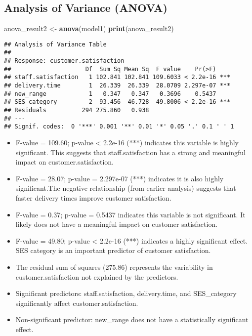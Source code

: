 \documentclass[
]{article}
\newenvironment{Shaded}{\begin{snugshade}}{\end{snugshade}}
\newcommand{\FunctionTok}[1]{\textcolor[rgb]{0.13,0.29,0.53}{\textbf{#1}}}
\newcommand{\NormalTok}[1]{#1}
\newcommand{\OtherTok}[1]{\textcolor[rgb]{0.56,0.35,0.01}{#1}}
\providecommand{\tightlist}{%
  \setlength{\itemsep}{0pt}\setlength{\parskip}{0pt}}
\begin{document}
\subsection{Analysis of Variance
(ANOVA)}\label{analysis-of-variance-anova-1}

\begin{Shaded}
\begin{Highlighting}[]
\NormalTok{anova\_result2 }\OtherTok{\textless{}{-}} \FunctionTok{anova}\NormalTok{(model1)}
\FunctionTok{print}\NormalTok{(anova\_result2)}
\end{Highlighting}
\end{Shaded}

\begin{verbatim}
## Analysis of Variance Table
## 
## Response: customer.satisfaction
##                     Df  Sum Sq Mean Sq  F value    Pr(>F)    
## staff.satisfaction   1 102.841 102.841 109.6033 < 2.2e-16 ***
## delivery.time        1  26.339  26.339  28.0709 2.297e-07 ***
## new_range            1   0.347   0.347   0.3696    0.5437    
## SES_category         2  93.456  46.728  49.8006 < 2.2e-16 ***
## Residuals          294 275.860   0.938                       
## ---
## Signif. codes:  0 '***' 0.001 '**' 0.01 '*' 0.05 '.' 0.1 ' ' 1
\end{verbatim}

\begin{itemize}
\tightlist
\item
  F-value = 109.60; p-value \textless{} 2.2e-16 (***) indicates this
  variable is highly significant. This suggests that staff.satisfaction
  has a strong and meaningful impact on customer.satisfaction.
\item
  F-value = 28.07; p-value = 2.297e-07 (***) indicates it is also highly
  significant.The negative relationship (from earlier analysis) suggests
  that faster delivery times improve customer satisfaction.
\item
  F-value = 0.37; p-value = 0.5437 indicates this variable is not
  significant. It likely does not have a meaningful impact on customer
  satisfaction.
\item
  F-value = 49.80; p-value \textless{} 2.2e-16 (***) indicates a highly
  significant effect. SES category is an important predictor of customer
  satisfaction.
\item
  The residual sum of squares (275.86) represents the variability in
  customer.satisfaction not explained by the predictors.
\item
  Significant predictors: staff.satisfaction, delivery.time, and
  SES\_category significantly affect customer.satisfaction.
\item
  Non-significant predictor: new\_range does not have a statistically
  significant effect.
\end{itemize}
\end{document}
